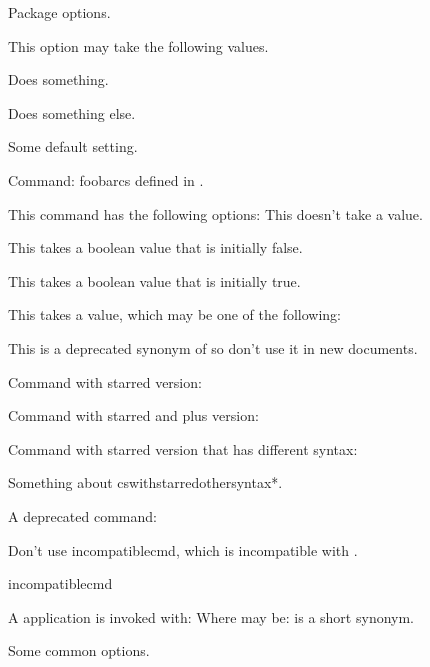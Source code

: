 \documentclass[titlepage=false,oneside,
 fontsize=12pt,captions=tableheading]{scrbook}
\begin{document}

Package options.

This option may take the following values.

Does something.

Does something else.

Some default setting.

Command: \gls{foobarcs} defined in .


This command has the following options:
This doesn't take a value.

This takes a boolean value that is initially false.

This takes a boolean value that is initially true.

This takes a value, which may be one of the following:


This is a deprecated synonym of
 so don't use it in new
documents.

Command with starred version:


Command with starred and plus version:


Command with starred version that has different syntax:


Something about \gls{cswithstarredothersyntax*}.

A deprecated command:


Don't use \gls{incompatiblecmd}, which is incompatible with
.
\begin{badcodebox}
\gls{incompatiblecmd}
\end{badcodebox}

A  application  is invoked with:
Where  may be:
 is a short synonym.

Some common options.
\end{document}
